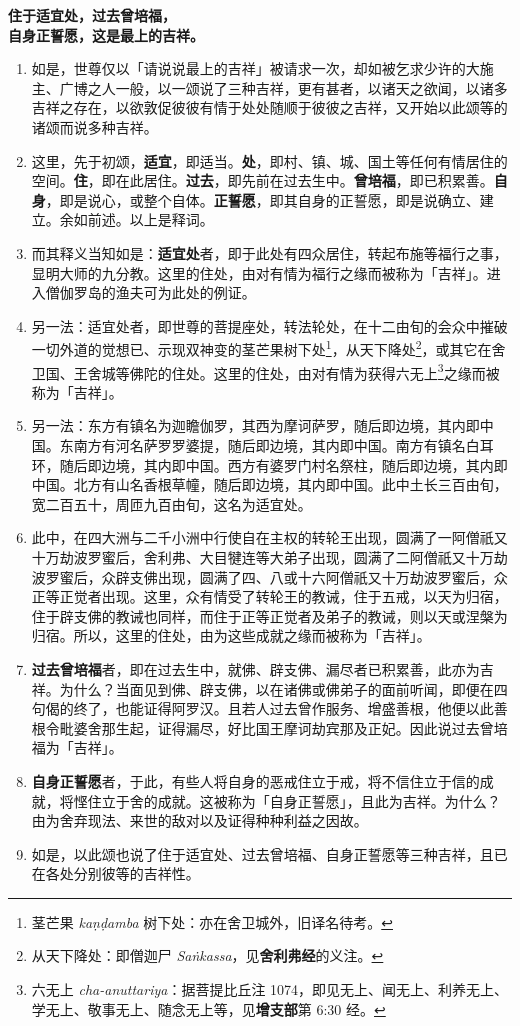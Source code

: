 \textbf{住于适宜处，过去曾培福，\\}
\textbf{自身正誓愿，这是最上的吉祥。}

\begin{enumerate}\item 如是，世尊仅以「请说说最上的吉祥」被请求一次，却如被乞求少许的大施主、广博之人一般，以一颂说了三种吉祥，更有甚者，以诸天之欲闻，以诸多吉祥之存在，以欲敦促彼彼有情于处处随顺于彼彼之吉祥，又开始以此颂等的诸颂而说多种吉祥。
\item 这里，先于初颂，\textbf{适宜}，即适当。\textbf{处}，即村、镇、城、国土等任何有情居住的空间。\textbf{住}，即在此居住。\textbf{过去}，即先前在过去生中。\textbf{曾培福}，即已积累善。\textbf{自身}，即是说心，或整个自体。\textbf{正誓愿}，即其自身的正誓愿，即是说确立、建立。余如前述。以上是释词。
\item 而其释义当知如是：\textbf{适宜处}者，即于此处有四众居住，转起布施等福行之事，显明大师的九分教。这里的住处，由对有情为福行之缘而被称为「吉祥」。进入僧伽罗岛的渔夫可为此处的例证。
\item 另一法：适宜处者，即世尊的菩提座处，转法轮处，在十二由旬的会众中摧破一切外道的觉想已、示现双神变的茎芒果树下处\footnote{茎芒果 \textit{kaṇḍamba} 树下处：亦在舍卫城外，旧译名待考。}，从天下降处\footnote{从天下降处：即僧迦尸 \textit{Saṅkassa}，见\textbf{舍利弗经}的义注。}，或其它在舍卫国、王舍城等佛陀的住处。这里的住处，由对有情为获得六无上\footnote{六无上 \textit{cha-anuttariya}：据菩提比丘注 1074，即见无上、闻无上、利养无上、学无上、敬事无上、随念无上等，见\textbf{增支部}第 6:30 经。}之缘而被称为「吉祥」。
\item 另一法：东方有镇名为迦瞻伽罗，其西为摩诃萨罗，随后即边境，其内即中国。东南方有河名萨罗罗婆提，随后即边境，其内即中国。南方有镇名白耳环，随后即边境，其内即中国。西方有婆罗门村名祭柱，随后即边境，其内即中国。北方有山名香根草幢，随后即边境，其内即中国。此中土长三百由旬，宽二百五十，周匝九百由旬，这名为适宜处。
\item 此中，在四大洲与二千小洲中行使自在主权的转轮王出现，圆满了一阿僧祇又十万劫波罗蜜后，舍利弗、大目犍连等大弟子出现，圆满了二阿僧祇又十万劫波罗蜜后，众辟支佛出现，圆满了四、八或十六阿僧祇又十万劫波罗蜜后，众正等正觉者出现。这里，众有情受了转轮王的教诫，住于五戒，以天为归宿，住于辟支佛的教诫也同样，而住于正等正觉者及弟子的教诫，则以天或涅槃为归宿。所以，这里的住处，由为这些成就之缘而被称为「吉祥」。
\item \textbf{过去曾培福}者，即在过去生中，就佛、辟支佛、漏尽者已积累善，此亦为吉祥。为什么？当面见到佛、辟支佛，以在诸佛或佛弟子的面前听闻，即便在四句偈的终了，也能证得阿罗汉。且若人过去曾作服务、增盛善根，他便以此善根令毗婆舍那生起，证得漏尽，好比国王摩诃劫宾那及正妃。因此说过去曾培福为「吉祥」。
\item \textbf{自身正誓愿}者，于此，有些人将自身的恶戒住立于戒，将不信住立于信的成就，将悭住立于舍的成就。这被称为「自身正誓愿」，且此为吉祥。为什么？由为舍弃现法、来世的敌对以及证得种种利益之因故。
\item 如是，以此颂也说了住于适宜处、过去曾培福、自身正誓愿等三种吉祥，且已在各处分别彼等的吉祥性。\end{enumerate}

